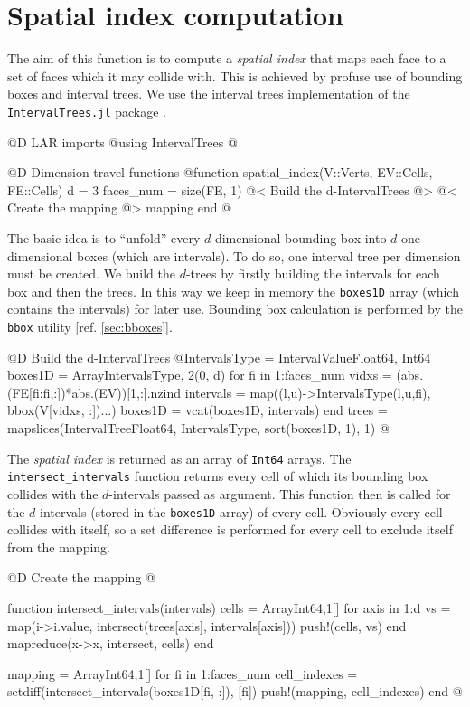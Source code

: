 \section{Spatial index computation}
\label{sec:spatial_index}

The aim of this function is to compute a \textit{spatial index} that maps
each face to a set of faces which it may collide with.
This is achieved by profuse use of bounding boxes and interval trees. 
We use the interval trees implementation of the \texttt{IntervalTrees.jl} package
\cite{IntervalTrees}.

@D LAR imports
@{using IntervalTrees
@}

@D Dimension travel functions
@{function spatial_index(V::Verts, EV::Cells, FE::Cells)
    d = 3
    faces_num = size(FE, 1)
    @< Build the d-IntervalTrees @>
    @< Create the mapping @>
    mapping
end
@}

The basic idea is to ``unfold'' every $d$-dimensional bounding box into $d$ one-dimensional boxes
(which are intervals).
To do so, one interval tree per dimension must be created. 
We build the $d$-trees by firstly building the intervals for each box and then the trees.
In this way we keep in memory the \texttt{boxes1D} array (which contains the intervals) for later use.
Bounding box calculation is performed by the \texttt{bbox} utility [ref. \ref{sec:bboxes}].

@D Build the d-IntervalTrees
@{IntervalsType = IntervalValue{Float64, Int64}
boxes1D = Array{IntervalsType, 2}(0, d)
for fi in 1:faces_num
    vidxs = (abs.(FE[fi:fi,:])*abs.(EV))[1,:].nzind
    intervals = map((l,u)->IntervalsType(l,u,fi), bbox(V[vidxs, :])...)
    boxes1D = vcat(boxes1D, intervals)
end
trees = mapslices(IntervalTree{Float64, IntervalsType}, sort(boxes1D, 1), 1)
@}

The \textit{spatial index} is returned as an array of 
\texttt{Int64} arrays. The \texttt{intersect\_intervals} 
function returns every cell of which its bounding box collides with 
the $d$-intervals passed as argument. This function 
then is called for the $d$-intervals (stored in the 
\texttt{boxes1D} array) of every cell. Obviously every 
cell collides with itself, so a set difference is 
performed for every cell to exclude itself from the mapping.

@D Create the mapping
@{function intersect_intervals(intervals)
    cells = Array{Int64,1}[]
    for axis in 1:d
        vs = map(i->i.value, intersect(trees[axis], intervals[axis]))
        push!(cells, vs)
    end
    mapreduce(x->x, intersect, cells)
end

mapping = Array{Int64,1}[]
for fi in 1:faces_num
    cell_indexes = setdiff(intersect_intervals(boxes1D[fi, :]), [fi])
    push!(mapping, cell_indexes)
end
@}


